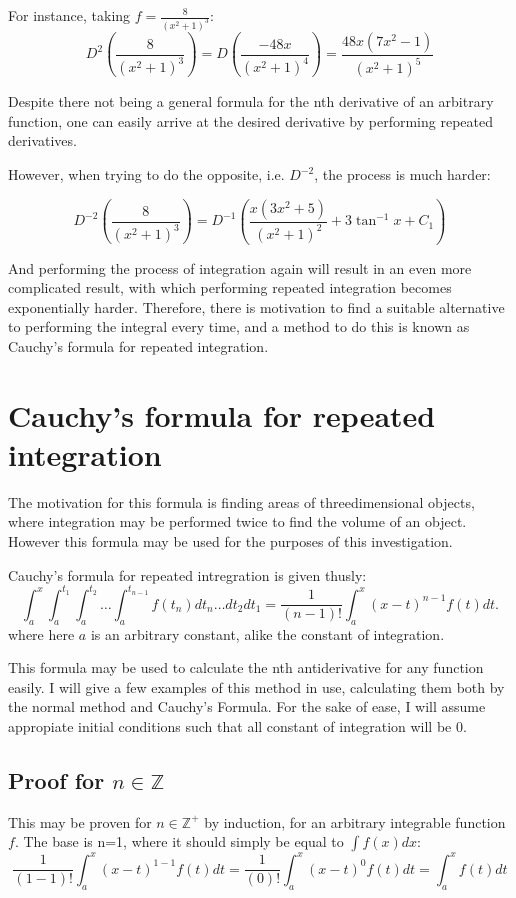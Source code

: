 \documentclass{article}
\begin{document}
For instance, taking $f = \frac{8}{(x^2+1)^3}$:
$$
D^2\left(\frac{8}{(x^2+1)^3}\right) =
D\left(\frac{-48x}{(x^2+1)^4}\right) =
\frac{48x(7x^2-1)}{(x^2+1)^5}
$$

Despite there not being a general formula for the nth derivative of an
arbitrary function, one can easily arrive at the desired derivative by
performing repeated derivatives.

However, when trying to do the opposite, i.e. $D^{-2}$, the process is much
harder:

$$
D^{-2}\left(\frac{8}{(x^2+1)^3}\right) =
D^{-1}\left(\frac{x\left(3x^2+5\right)}{\left(x^2+1\right)^2} +
3\tan^{-1}{x} + C_1 \right)
$$

And performing the process of integration again will result in an even more
complicated result, with which performing repeated integration becomes
exponentially harder. Therefore, there is motivation to find a suitable
alternative to performing the integral every time, and a method to do this is
known as Cauchy's formula for repeated integration.

\section{Cauchy's formula for repeated integration}

The motivation for this formula is finding areas of threedimensional objects,
where integration may be performed twice to find the volume of an
object. However this formula may be used for the purposes of this investigation.

Cauchy's formula for repeated intregration is given thusly:
$$
\int_a^x
\int_a^{t_1}
\int_a^{t_2}
\ldots
\int_a^{t_{n-1}}f\left(t_n\right) dt_n \ldots dt_2 dt_1
=
\frac{1}{(n-1)!}\int_a^x\left(x-t\right)^{n-1}f\left(t\right)dt.
$$
where here $a$ is an arbitrary constant, alike the constant of integration.

This formula may be used to calculate the nth antiderivative for any function
easily. I will give a few examples of this method in use, calculating them both
by the normal method and Cauchy's Formula. For the sake of ease, I will assume
appropiate initial conditions such that all constant of integration will be
$0$.


\subsection{Proof for $n \in \mathbb{Z}$}

This may be proven for $n \in \mathbb{Z}^+$ by induction, for an arbitrary
integrable function $f$. The base is n=1, where it should simply be equal to
$\int
f\left(x\right)dx$:
$$
\frac{1}{(1-1)!}\int_a^x\left(x-t\right)^{1-1}f\left(t\right)dt =
\frac{1}{(0)!}\int_a^x\left(x-t\right)^{0}f\left(t\right)dt =
\int_a^xf\left(t\right)dt
$$
\end{document}

